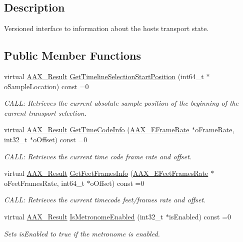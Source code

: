 \subsection{Description}
Versioned interface to information about the host\textquotesingle{}s transport state. \subsection*{Public Member Functions}
\begin{DoxyCompactItemize}
\item 
virtual \mbox{\hyperlink{a00392_a4d8f69a697df7f70c3a8e9b8ee130d2f}{A\+A\+X\+\_\+\+Result}} \mbox{\hyperlink{a01761_a2ed1e7eb242706350126e1f0f80ef89a}{Get\+Timeline\+Selection\+Start\+Position}} (int64\+\_\+t $\ast$o\+Sample\+Location) const =0
\begin{DoxyCompactList}\small\item\em C\+A\+LL\+: Retrieves the current absolute sample position of the beginning of the current transport selection. \end{DoxyCompactList}\item 
virtual \mbox{\hyperlink{a00392_a4d8f69a697df7f70c3a8e9b8ee130d2f}{A\+A\+X\+\_\+\+Result}} \mbox{\hyperlink{a01761_a3190f47a60f2b99d3a6b904f0eada0bf}{Get\+Time\+Code\+Info}} (\mbox{\hyperlink{a00491_a1271a51553bf508de59864334111aa8f}{A\+A\+X\+\_\+\+E\+Frame\+Rate}} $\ast$o\+Frame\+Rate, int32\+\_\+t $\ast$o\+Offset) const =0
\begin{DoxyCompactList}\small\item\em C\+A\+LL\+: Retrieves the current time code frame rate and offset. \end{DoxyCompactList}\item 
virtual \mbox{\hyperlink{a00392_a4d8f69a697df7f70c3a8e9b8ee130d2f}{A\+A\+X\+\_\+\+Result}} \mbox{\hyperlink{a01761_af56a07926c753c6b225c316c5b516aa5}{Get\+Feet\+Frames\+Info}} (\mbox{\hyperlink{a00491_a8a0c9dafef741a26ee8c06f7285a0dfa}{A\+A\+X\+\_\+\+E\+Feet\+Frames\+Rate}} $\ast$o\+Feet\+Frames\+Rate, int64\+\_\+t $\ast$o\+Offset) const =0
\begin{DoxyCompactList}\small\item\em C\+A\+LL\+: Retrieves the current timecode feet/frames rate and offset. \end{DoxyCompactList}\item 
virtual \mbox{\hyperlink{a00392_a4d8f69a697df7f70c3a8e9b8ee130d2f}{A\+A\+X\+\_\+\+Result}} \mbox{\hyperlink{a01761_a64bc3e6707297e32190e7aa290513521}{Is\+Metronome\+Enabled}} (int32\+\_\+t $\ast$is\+Enabled) const =0
\begin{DoxyCompactList}\small\item\em Sets is\+Enabled to true if the metronome is enabled. \end{DoxyCompactList}\end{DoxyCompactItemize}


